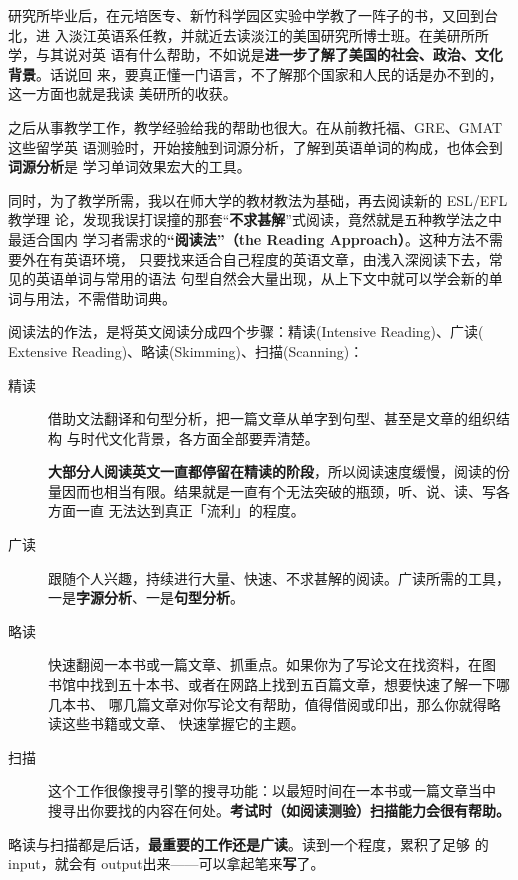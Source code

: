 研究所毕业后，在元培医专、新竹科学园区实验中学教了一阵子的书，又回到台北，进
入淡江英语系任教，并就近去读淡江的美国研究所博士班。在美研所所学，与其说对英
语有什么帮助，不如说是\textbf{进一步了解了美国的社会、政治、文化背景}。话说回
来，要真正懂一门语言，不了解那个国家和人民的话是办不到的，这一方面也就是我读
美研所的收获。

之后从事教学工作，教学经验给我的帮助也很大。在从前教托福、GRE、GMAT这些留学英
语测验时，开始接触到词源分析，了解到英语单词的构成，也体会到\textbf{词源分析}是
学习单词效果宏大的工具。

同时，为了教学所需，我以在师大学的教材教法为基础，再去阅读新的 ESL/EFL教学理
论，发现我误打误撞的那套“\textbf{不求甚解}”式阅读，竟然就是五种教学法之中最适合国内
学习者需求的\textbf{“阅读法”（the Reading Approach）}。这种方法不需要外在有英语环境，
只要找来适合自己程度的英语文章，由浅入深阅读下去，常见的英语单词与常用的语法
句型自然会大量出现，从上下文中就可以学会新的单词与用法，不需借助词典。

阅读法的作法，是将英文阅读分成四个步骤：精读(Intensive Reading)、广读(
Extensive Reading)、略读(Skimming)、扫描(Scanning)：
\begin{description}
\item[精读] 借助文法翻译和句型分析，把一篇文章从单字到句型、甚至是文章的组织结构
  与时代文化背景，各方面全部要弄清楚。

  \textbf{大部分人阅读英文一直都停留在精读的阶段}，所以阅读速度缓慢，阅读的份
  量因而也相当有限。结果就是一直有个无法突破的瓶颈，听、说、读、写各方面一直
  无法达到真正「流利」的程度。

\item[广读] 跟随个人兴趣，持续进行大量、快速、不求甚解的阅读。广读所需的工具，
  一是\textbf{字源分析}、一是\textbf{句型分析}。

\item[略读] 快速翻阅一本书或一篇文章、抓重点。如果你为了写论文在找资料，在图
  书馆中找到五十本书、或者在网路上找到五百篇文章，想要快速了解一下哪几本书、
  哪几篇文章对你写论文有帮助，值得借阅或印出，那么你就得略读这些书籍或文章、
  快速掌握它的主题。

\item[扫描] 这个工作很像搜寻引擎的搜寻功能：以最短时间在一本书或一篇文章当中
  搜寻出你要找的内容在何处。\textbf{考试时（如阅读测验）扫描能力会很有帮助。}
\end{description}

略读与扫描都是后话，\textbf{最重要的工作还是广读}。读到一个程度，累积了足够
的 input，就会有 output出来——可以拿起笔来\textbf{写}了。

